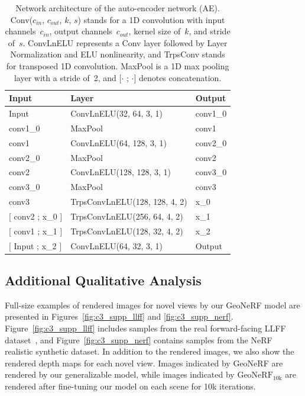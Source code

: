 \begin{table}[t]
    \begin{center}
        \begin{threeparttable}
            \begin{tabular}{lll}
            Input &  Layer & Output  \\
            \hline
            Input & ConvLnELU(32, 64, 3, 1) & conv1\_0  \\
            conv1\_0 & MaxPool & conv1 \\
            conv1 & ConvLnELU(64, 128, 3, 1) & conv2\_0 \\
            conv2\_0 & MaxPool & conv2 \\
            conv2 & ConvLnELU(128, 128, 3, 1) & conv3\_0 \\
            conv3\_0 & MaxPool & conv3 \\
            conv3 & TrpsConvLnELU(128, 128, 4, 2) & x\_0 \\
            $[$ conv2 ; x\_0 $]$ & TrpsConvLnELU(256, 64, 4, 2) & x\_1 \\
            $[$ conv1 ; x\_1 $]$ & TrpsConvLnELU(128, 32, 4, 2) & x\_2 \\
            $[$ Input ; x\_2 $]$ & ConvLnELU(64, 32, 3, 1) & Output \\
            \hline
            \end{tabular}
        \end{threeparttable}
    \end{center}
    \caption{Network architecture of the auto-encoder network (AE). Conv($c_{in}$, $c_{out}$, $k$, $s$) stands for a 1D convolution with input channels~$c_{in}$, output channels~$c_{out}$, kernel size of~$k$, and stride of~$s$. ConvLnELU represents a Conv layer followed by Layer Normalization and ELU nonlinearity, and TrpsConv stands for transposed 1D convolution. MaxPool is a 1D max pooling layer with a stride of~2, and $[\cdot$ ; $\cdot]$ denotes concatenation.}
    \label{table:arch_ae}
\end{table}

\clearpage

\subsection{Additional Qualitative Analysis}
Full-size examples of rendered images for novel views by our GeoNeRF model are presented in Figures~\ref{fig:c3_supp_llff} and \ref{fig:c3_supp_nerf}. Figure~\ref{fig:c3_supp_llff} includes samples from the real forward-facing LLFF dataset~\citep{mildenhall2019llff}, and Figure~\ref{fig:c3_supp_nerf} contains samples from the NeRF realistic synthetic dataset\citep{mildenhall2020nerf}. In addition to the rendered images, we also show the rendered depth maps for each novel view. Images indicated by GeoNeRF are rendered by our generalizable model, while images indicated by $\text{GeoNeRF}_{\text{10k}}$ are rendered after fine-tuning our model on each scene for 10k iterations.

